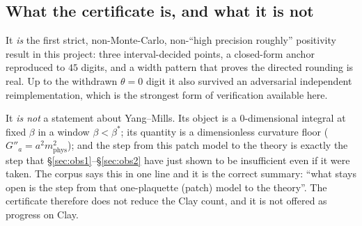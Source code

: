 
\subsection{What the certificate is, and what it is not}

It \emph{is} the first strict, non-Monte-Carlo, non-``high precision roughly'' positivity result in
this project: three interval-decided points, a closed-form anchor reproduced to $45$ digits, and a
width pattern that proves the directed rounding is real. Up to the withdrawn $\theta=0$ digit it
also survived an adversarial independent reimplementation, which is the strongest form of
verification available here.

It \emph{is not} a statement about Yang--Mills. Its object is a $0$-dimensional integral at fixed
$\beta$ in a window $\beta<\beta^{*}$; its quantity is a dimensionless curvature floor
($G''_a=a^{2}m^{2}_{\mathrm{phys}}$); and the step from this patch model to the theory is exactly
the step that \S\ref{sec:obs1}--\S\ref{sec:obs2} have just shown to be insufficient even if it were
taken. The corpus says this in one line and it is the correct summary: ``what stays open is the
step from that one-plaquette (patch) model to the theory''. \LM{} The certificate therefore does
not reduce the Clay count, and it is not offered as progress on Clay.

